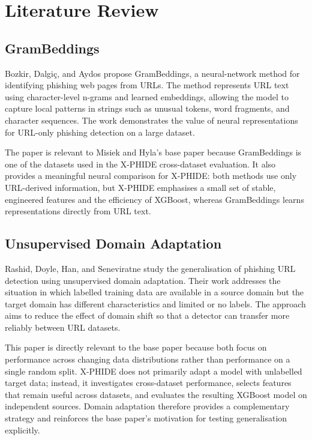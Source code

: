 \chapter{Literature Review}
\setcounter{equation}{0}
\section{GramBeddings}
Bozkir, Dalgi\c{c}, and Aydos propose GramBeddings, a neural-network method for identifying phishing web pages from URLs. The method represents URL text using character-level n-grams and learned embeddings, allowing the model to capture local patterns in strings such as unusual tokens, word fragments, and character sequences. The work demonstrates the value of neural representations for URL-only phishing detection on a large dataset.\cite{bib2}

The paper is relevant to Misiek and Hyla's base paper because GramBeddings is one of the datasets used in the X-PHIDE cross-dataset evaluation. It also provides a meaningful neural comparison for X-PHIDE: both methods use only URL-derived information, but X-PHIDE emphasises a small set of stable, engineered features and the efficiency of XGBoost, whereas GramBeddings learns representations directly from URL text.\cite{bib1,bib2}

\section{Unsupervised Domain Adaptation}
Rashid, Doyle, Han, and Seneviratne study the generalisation of phishing URL detection using unsupervised domain adaptation. Their work addresses the situation in which labelled training data are available in a source domain but the target domain has different characteristics and limited or no labels. The approach aims to reduce the effect of domain shift so that a detector can transfer more reliably between URL datasets.\cite{bib3}

This paper is directly relevant to the base paper because both focus on performance across changing data distributions rather than performance on a single random split. X-PHIDE does not primarily adapt a model with unlabelled target data; instead, it investigates cross-dataset performance, selects features that remain useful across datasets, and evaluates the resulting XGBoost model on independent sources. Domain adaptation therefore provides a complementary strategy and reinforces the base paper's motivation for testing generalisation explicitly.\cite{bib1,bib3}

